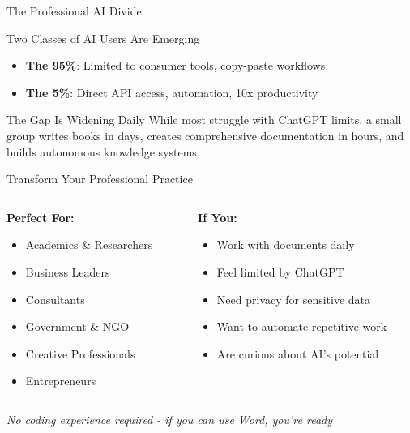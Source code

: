 \documentclass{beamer}
\begin{document}
\begin{frame}{The Professional AI Divide}
\begin{center}
\Large{Two Classes of AI Users Are Emerging}
\end{center}
\vspace{1em}
\begin{itemize}
\item \textbf{The 95\%}: Limited to consumer tools, copy-paste workflows
\item \textbf{The 5\%}: Direct API access, automation, 10x productivity
\end{itemize}
\vspace{1em}
\begin{alertblock}{The Gap Is Widening Daily}
While most struggle with ChatGPT limits, a small group writes books in days, creates comprehensive documentation in hours, and builds autonomous knowledge systems.
\end{alertblock}
\end{frame}

\begin{frame}{Transform Your Professional Practice}
\begin{columns}[T]
\begin{column}{0.45\textwidth}
\textbf{Perfect For:}
\begin{itemize}
\item Academics \& Researchers
\item Business Leaders
\item Consultants
\item Government \& NGO
\item Creative Professionals
\item Entrepreneurs
\end{itemize}
\end{column}
\begin{column}{0.45\textwidth}
\textbf{If You:}
\begin{itemize}
\item Work with documents daily
\item Feel limited by ChatGPT
\item Need privacy for sensitive data
\item Want to automate repetitive work
\item Are curious about AI's potential
\end{itemize}
\end{column}
\end{columns}
\vspace{0.5em}
\begin{center}
\small{\textit{No coding experience required - if you can use Word, you're ready}}
\end{center}
\end{frame}
\end{document}
